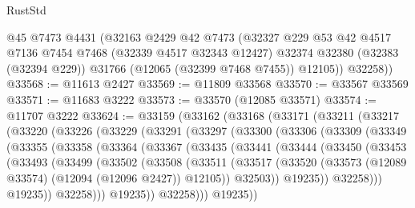\begin{lexlean}{RustStd}
\begin{coremodule}
        @45
        @7473
        @4431
        (@32163
          @2429
          @42
          @7473
          (@32327
            @229
            @53
            @42
            @4517
            @7136
            @7454
            @7468
            (@32339 @4517 @32343 @12427)
            @32374
            @32380
            (@32383 (@32394 @229))
            @31766
            (@12065 (@32399 @7468 @7455))
            @12105))
        @32258))
@33568 := @11613 @2427
@33569 := @11809 @33568
@33570 := @33567 @33569
@33571 := @11683 @3222
@33573 := @33570 (@12085 @33571)
@33574 := @11707 @3222
@33624 := @33159
    (@33162
      (@33168
        (@33171
          (@33211
            (@33217
              (@33220
                (@33226
                  (@33229
                    (@33291
                      (@33297
                        (@33300
                          (@33306
                            (@33309
                              (@33349
                                (@33355
                                  (@33358
                                    (@33364
                                      (@33367
                                        (@33435
                                          (@33441
                                            (@33444
                                              (@33450
                                                (@33453
                                                  (@33493
                                                    (@33499
                                                      (@33502
                                                        (@33508
                                                          (@33511
                                                            (@33517
                                                              (@33520
                                                                (@33573
                                                                  (@12089 @33574)
                                                                  (@12094 (@12096 @2427))
                                                                  @12105))
                                                              @32503))
                                                          @19235))
                                                      @32258)))
                                                @19235))
                                            @32258)))
                                      @19235))
                                  @32258)))
                            @19235))

\end{coremodule}
\end{lexlean}
